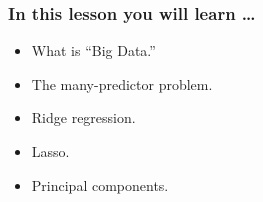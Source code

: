 

\begin{frame}
\frametitle{In this lesson you will learn \dots}
\begin{itemize}
\item What is ``Big Data.''
\item The many-predictor problem.
\item Ridge regression.
\item Lasso.
\item Principal components.
\end{itemize}
\end{frame}

